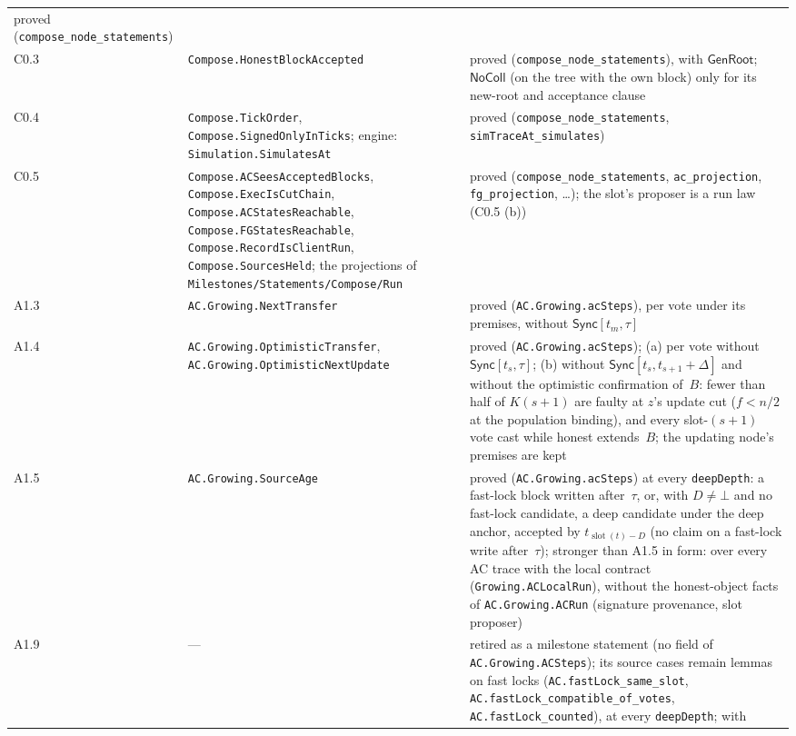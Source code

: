 \documentclass{article}
\newcommand{\slot}{\operatorname{slot}}
\begin{document}
{\begin{longtable}{@{}>{\raggedright\arraybackslash}p{1.6cm}>{\raggedright\arraybackslash}p{6.2cm}>{\raggedright\arraybackslash}p{5.2cm}@{}}
  proved (\texttt{compose\_node\_statements})\\
C0.3 & \texttt{Compose.HonestBlockAccepted} & proved
  (\texttt{compose\_node\_statements}), with $\mathsf{GenRoot}$;
  $\mathsf{NoColl}$ (on the tree with the own block) only for its new-root
  and acceptance clause\\
C0.4 & \texttt{Compose.TickOrder}, \texttt{Compose.SignedOnlyInTicks};
  engine: \texttt{Simulation.SimulatesAt} & proved
  (\texttt{compose\_node\_statements}, \texttt{simTraceAt\_simulates})\\
C0.5 & \texttt{Compose.ACSeesAcceptedBlocks}, \texttt{Compose.ExecIsCutChain},
  \texttt{Compose.ACStatesReachable}, \texttt{Compose.FGStatesReachable},
  \texttt{Compose.RecordIsClientRun}, \texttt{Compose.SourcesHeld}; the
  projections of \texttt{Milestones/Statements/Compose/Run} & proved
  (\texttt{compose\_node\_statements}, \texttt{ac\_projection}, \texttt{fg\_projection}, \dots); the slot's
  proposer is a run law (C0.5 (b))\\
A1.3 & \texttt{AC.Growing.NextTransfer} & proved (\texttt{AC.Growing.acSteps}), per vote under
  its premises, without $\mathsf{Sync}[t_m,\tau]$\\
A1.4 & \texttt{AC.Growing.OptimisticTransfer}, \texttt{AC.Growing.OptimisticNextUpdate} &
  proved (\texttt{AC.Growing.acSteps}); (a) per vote without $\mathsf{Sync}[t_s,\tau]$;
  (b) without $\mathsf{Sync}[t_s,t_{s+1}+\Delta]$ and without the
  optimistic confirmation of~$B$: fewer than half of $K(s+1)$ are faulty
  at $z$'s update cut ($f<n/2$ at the population binding), and every
  slot-$(s+1)$ vote cast while honest extends~$B$; the updating node's
  premises are kept\\
A1.5 & \texttt{AC.Growing.SourceAge} & proved (\texttt{AC.Growing.acSteps}) at every
  \texttt{deepDepth}: a fast-lock block written after~$\tau$, or, with
  $D\neq\bot$ and no fast-lock candidate, a deep candidate under the deep
  anchor, accepted by $t_{\slot(t)-D}$ (no claim on a fast-lock write
  after~$\tau$); stronger than
  A1.5 in form: over every AC trace with the local contract
  (\texttt{Growing.ACLocalRun}), without the honest-object facts of
  \texttt{AC.Growing.ACRun} (signature provenance, slot proposer)\\
A1.9 & --- & retired as a milestone statement (no field of
  \texttt{AC.Growing.ACSteps}); its source cases remain lemmas on fast locks
  (\texttt{AC.fastLock\_same\_slot}, \texttt{AC.fastLock\_compatible\_of\_votes},
  \texttt{AC.fastLock\_counted}), at every \texttt{deepDepth}; with

\end{longtable}}
\end{document}
